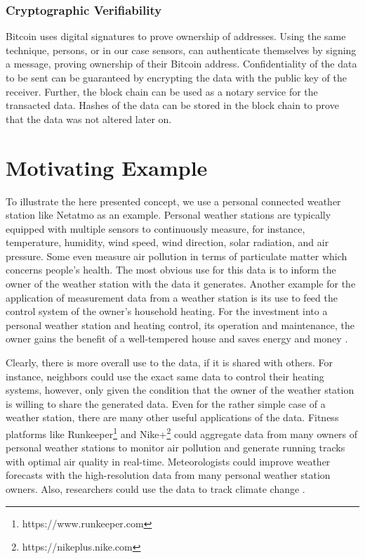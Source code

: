 \subsubsection{Cryptographic Verifiability}
Bitcoin uses digital signatures to prove ownership of addresses. Using the same technique, persons, or in our case sensors, can authenticate themselves by signing a message, proving ownership of their Bitcoin address. Confidentiality of the data to be sent can be guaranteed by encrypting the data with the public key of the receiver. Further, the block chain can be used as a notary service for the transacted data. Hashes of the data can be stored in the block chain to prove that the data was not altered later on.


\section{Motivating Example}

To illustrate the here presented concept, we use a personal connected weather station like Netatmo \parencite{netatmo} as an example. Personal weather stations are typically equipped with multiple sensors to continuously measure, for instance, temperature, humidity, wind speed, wind direction, solar radiation, and air pressure. Some even measure air pollution in terms of particulate matter which concerns people's health. The most obvious use for this data is to inform the owner of the weather station with the data it generates. Another example for the application of measurement data from a weather station is its use to feed the control system of the owner's household heating. For the investment into a personal weather station and heating control, its operation and maintenance, the owner gains the benefit of a well-tempered house and saves energy and money \parencite{dong2014real}. 

Clearly, there is more overall use to the data, if it is shared with others. For instance, neighbors could use the exact same data to control their heating systems, however, only given the condition that the owner of the weather station is willing to share the generated data. Even for the rather simple case of a weather station, there are many other useful applications of the data. Fitness platforms like Runkeeper\footnote{https://www.runkeeper.com} and Nike+\footnote{https://nikeplus.nike.com} could aggregate data from many owners of personal weather stations to monitor air pollution and generate running tracks with optimal air quality in real-time. Meteorologists could improve weather forecasts with the high-resolution data from many personal weather station owners. Also, researchers could use the data to track climate change \parencite{JOC:JOC1276}.

